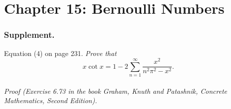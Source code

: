 \documentclass{article}
\begin{document}
\newpage
\section*{Chapter 15: Bernoulli Numbers \\}






\subsubsection*{Supplement.}
Equation (4) on page 231.
\emph{Prove that $$x \cot x = 1 - 2 \sum_{n=1}^{\infty} \frac{x^2}{n^2 \pi^2 - x^2}.$$} \\

\emph{Proof (Exercise 6.73 in the book Graham, Knuth and Patashnik,
Concrete Mathematics, Second Edition).}
\end{document}
